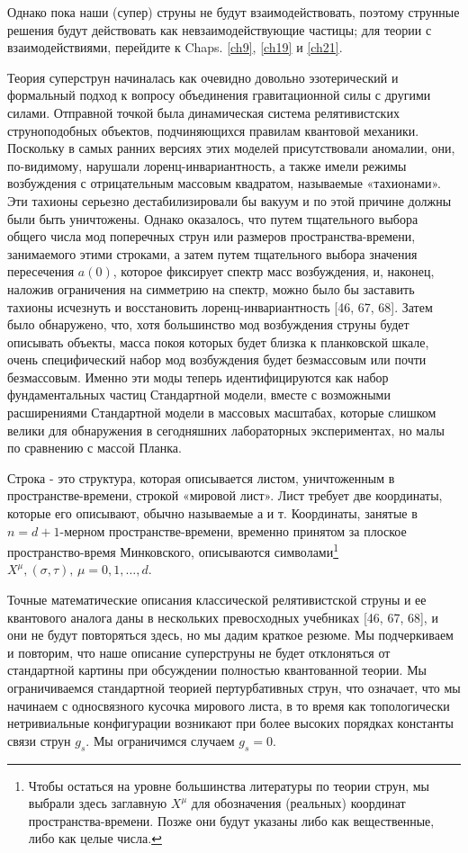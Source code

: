 \documentclass[main.tex]{subfiles}
\begin{document}
Однако пока наши (супер) струны не будут взаимодействовать, поэтому струнные решения будут действовать как невзаимодействующие частицы; для теории с взаимодействиями, перейдите к Chaps. \ref{ch9}, \ref{ch19} и \ref{ch21}.

Теория суперструн начиналась как очевидно довольно эзотерический и формальный подход к вопросу объединения гравитационной силы с другими силами. Отправной точкой была динамическая система релятивистских струноподобных объектов, подчиняющихся правилам квантовой механики. Поскольку в самых ранних версиях этих моделей присутствовали аномалии, они, по-видимому, нарушали лоренц-инвариантность, а также имели режимы возбуждения с отрицательным массовым квадратом, называемые «тахионами». Эти тахионы серьезно дестабилизировали бы вакуум и по этой причине должны были быть уничтожены. Однако оказалось, что путем тщательного выбора общего числа мод поперечных струн или размеров пространства-времени, занимаемого этими строками, а затем путем тщательного выбора значения пересечения $a(0)$, которое фиксирует спектр масс возбуждения, и, наконец, наложив ограничения на симметрию на спектр, можно было бы заставить тахионы исчезнуть и восстановить лоренц-инвариантность [46, 67, 68]. Затем было обнаружено, что, хотя большинство мод возбуждения струны будет описывать объекты, масса покоя которых будет близка к планковской шкале, очень специфический набор мод возбуждения будет безмассовым или почти безмассовым. Именно эти моды теперь идентифицируются как набор фундаментальных частиц Стандартной модели, вместе с возможными расширениями Стандартной модели в массовых масштабах, которые слишком велики для обнаружения в сегодняшних лабораторных экспериментах, но малы по сравнению с массой Планка.

Строка - это структура, которая описывается листом, уничтоженным в пространстве-времени, строкой «мировой лист». Лист требует две координаты, которые его описывают, обычно называемые а и т. Координаты, занятые в $n = d + 1$-мерном пространстве-времени, временно принятом за плоское пространство-время Минковского, описываются символами\footnote{Чтобы остаться на уровне большинства литературы по теории струн, мы выбрали здесь заглавную $X^\mu$ для обозначения (реальных) координат пространства-времени. Позже они будут указаны либо как вещественные, либо как целые числа.} $X^\mu,(\sigma, \tau),\, \mu = 0, 1,\ldots, d$.

Точные математические описания классической релятивистской струны и ее квантового аналога даны в нескольких превосходных учебниках [46, 67, 68], и они не будут повторяться здесь, но мы дадим краткое резюме. Мы подчеркиваем и повторим, что наше описание суперструны не будет отклоняться от стандартной картины при обсуждении полностью квантованной теории. Мы ограничиваемся стандартной теорией пертурбативных струн, что означает, что мы начинаем с односвязного кусочка мирового листа, в то время как топологически нетривиальные конфигурации возникают при более высоких порядках константы связи струн $g_s$. Мы ограничимся случаем $g_s = 0$.
\end{document}
